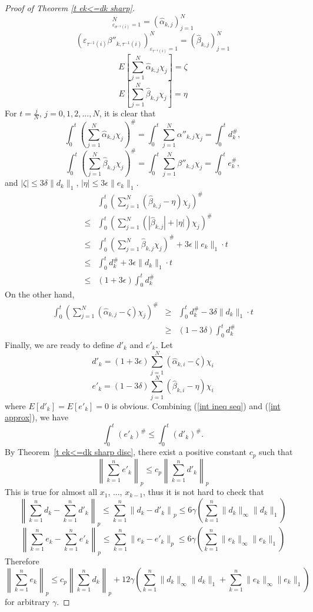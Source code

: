 \documentclass[12pt]{amsart}
\begin{document}
\begin{proof}[Proof of Theorem \ref{t ek<=dk sharp}]
\[_{\varepsilon_{\sigma^{-1}(i)}=1}^N=\left(\hat{\alpha}_{k,j}\right)_{j=1}^N\]
\[\left(\varepsilon_{\tau^{-1}(i)}\beta''_{k,\tau ^{-1}(i)}\right)
_{\varepsilon_{\tau^{-1}(i)}=1}^N=\left(\hat{\beta
}_{k,j}\right)_{j=1}^N\]
\[E\left[\sum_{j=1}^N \hat{\alpha }_{k,j}\chi_j\right]=\zeta\]
\[E\left[\sum_{j=1}^N \hat{\beta }_{k,j}\chi_j\right]=\eta \]
For $t=\frac{j}{N}$, $j=0,1,2,...,N$, it is clear that
\[\int_0^t \left( \sum_{j=1}^N \hat{\alpha }_{k,j}\chi _j \right)^\# =
\int_0^t \sum_{j=1}^N \alpha'' _{k,j}\chi _j=\int_0^t d_k^\#,\]
\[\int_0^t \left( \sum_{j=1}^N \hat{\beta }_{k,j}\chi _j \right)^\# =
\int_0^t \sum_{j=1}^N \beta'' _{k,j}\chi _j=\int_0^t e_k^\#,\] and
$|\zeta | \leq 3\delta\|d_k\|_1 $, $|\eta|\leq
3\epsilon\|e_k\|_1$.
\begin{eqnarray}
\label{int ineq seq}
& &\int_0^t \left(\sum_{j=1}^N \left(\hat{\beta}_{k,j}-\eta \right)\chi _j \right)^\# \\
& \leq &\int_0^t\left(\sum_{j=1}^N\left(|\hat{\beta}_{k,j}|+|\eta |\right)\chi _j \right)^\#\nonumber\\
& \leq &\int_0^t \left( \sum_{j=1}^N \hat{\beta}_{k,j}\chi _j
\right)^\# +
3\epsilon \|e_k\|_1\cdot t\nonumber\\
& \leq & \int_0^t d_k^\# + 3\epsilon \|d_k\|_1\cdot t\nonumber\\
& \leq & (1+3\epsilon)\int_0^t d_k^\# \nonumber
\end{eqnarray}
On the other hand,
\begin{eqnarray}
\label{int approx}
\int_0^t \left(\sum_{j=1}^N\left(\hat{\alpha}_{k,j}-\zeta
\right)\chi _j \right)^\#
&\geq & \int_0^t d_k^\# - 3\delta\|d_k\|_1\cdot t\\
&\geq & (1-3\delta)\int_0^t d_k^\#\nonumber
\end{eqnarray}
Finally, we are ready to define $d'_k$ and $e'_k$. Let
\[d'_k= (1+3\epsilon) \sum_{j=1}^N (\hat{\alpha }_{k,i}-\zeta )\chi_i \]
\[e'_k= (1-3\delta) \sum_{j=1}^N (\hat{\beta }_{k,i}-\eta )\chi _i\]
where $E[d'_k]=E[e'_k]=0 $ is obvious. 
Combining (\ref{int ineq seq}) and (\ref{int approx}), we
have
\[ \int_0^t (e'_k)^\# \leq \int_0^t (d'_k)^\# . \]
By Theorem~\ref{t ek<=dk sharp disc}, 
there exist a positive constant $c_p$ such
that
\[ \left\|\sum_{k=1}^n e'_k \right\|_p \leq c_p \left\| \sum_{k=1}^n d'_k \right\|_p\]
This is true for almost all $x_1$, ..., $x_{k-1}$, thus it is not
hard to check that
\[ \left\|\sum_{k=1}^n  d_k-\sum_{k=1}^n d'_k \right\|_p \leq \sum_{k=1}^n \left\|d_k -d'_k \right\|_p \leq
6\gamma\left(\sum_{k=1}^n \|d_k\|_\infty\|d_k\|_1\right)\]
\[ \left\|\sum_{k=1}^n e_k-\sum_{k=1}^n e'_k \right\|_p \leq \sum_{k=1}^n \|e_k -e'_k\|_p \leq
6\gamma \left(\sum_{k=1}^n \|e_k\|_\infty\|e_k\|_1\right)\]
Therefore
\[ \left\|\sum_{k=1}^n e_k \right\|_p \leq c_p \left\| \sum_{k=1}^n d_k \right\|_p +
12\gamma \left(\sum_{k=1}^n \|d_k\|_\infty \|d_k\|_1 +\sum_{k=1}^n
\|e_k\|_\infty\|e_k\|_1\right)\] for arbitrary $ \gamma$.
\end{proof}
\end{document}
